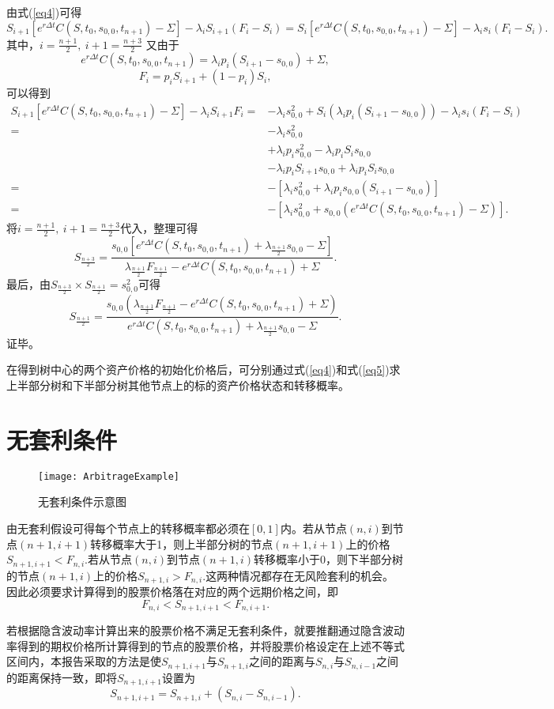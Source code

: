 \begin{Proof}
	由式(\ref{eq4})可得
	$$S_{i+1}\left[e^{r\Delta t}C(S,t_0,s_{0,0},t_{n+1}) -\Sigma \right]-\lambda_iS_{i+1}(F_i-S_i) = S_i\left[e^{r\Delta t}C(S,t_0,s_{0,0},t_{n+1}) -\Sigma \right]-\lambda_is_i(F_i-S_i).$$
	其中，$i = \frac{n+1}{2},\ i+1 = \frac{n+3}{2}$
	又由于
	$$e^{r\Delta t}C(S,t_0,s_{0,0},t_{n+1})  = \lambda_ip_i(S_{i+1}-s_{0,0})+\Sigma,$$
	$$F_i = p_iS_{i+1}+(1-p_i)S_i,$$
	可以得到
	\begin{align}
		S_{i+1}\left[e^{r\Delta t}C(S,t_0,s_{0,0},t_{n+1}) -\Sigma \right]-\lambda_iS_{i+1}F_i 
		=& -\lambda_is_{0,0}^2+S_i\left(\lambda_ip_i(S_{i+1}-s_{0,0})\right)-\lambda_is_i(F_i-S_i) \nonumber\\
		=&  -\lambda_is_{0,0}^2 \nonumber\\
		&+ \lambda_ip_is_{0,0}^2-\lambda_ip_iS_is_{0,0}\nonumber\\
		&-\lambda_ip_iS_{i+1}s_{0,0}+\lambda_ip_iS_is_{0,0}\nonumber\\
		= & -\left[\lambda_is_{0,0}^2+\lambda_ip_is_{0,0}(S_{i+1}-s_{0,0})\right] \nonumber\\
		= & -\left[\lambda_is_{0,0}^2+s_{0,0}\left(e^{r\Delta t}C(S,t_0,s_{0,0},t_{n+1})-\Sigma\right)\right] .\nonumber 
	\end{align}
	将$i = \frac{n+1}{2},\ i+1 = \frac{n+3}{2}$代入，整理可得
	$$S_{\frac{n+3}{2}} = \frac{s_{0,0}\left[e^{r\Delta t}C(S,t_0,s_{0,0},t_{n+1})+\lambda_{\frac{n+1}{2}} s_{0,0} - \Sigma\right]}{\lambda_{\frac{n+1}{2}} F_{\frac{n+1}{2}}-e^{r\Delta t}C(S,t_0,s_{0,0},t_{n+1})+\Sigma}.$$
	最后，由$S_{\frac{n+3}{2}}\times S_{\frac{n+1}{2}} = s_{0,0}^2$可得
	$$S_{\frac{n+1}{2}}  = \frac{s_{0,0}\left(\lambda_{\frac{n+1}{2}}  F_{\frac{n+1}{2}} - e^{r\Delta t}C(S,t_0,s_{0,0},t_{n+1}) + \Sigma \right)}{e^{r\Delta t}C(S,t_0,s_{0,0},t_{n+1})+\lambda_{\frac{n+1}{2}} s_{0,0}-\Sigma}.$$
	证毕。
\end{Proof}
在得到树中心的两个资产价格的初始化价格后，可分别通过式(\ref{eq4})和式(\ref{eq5})求上半部分树和下半部分树其他节点上的标的资产价格状态和转移概率。

\section{无套利条件}
\begin{figure}[H]
	\centering
	\texttt{[image: ArbitrageExample]}
	\caption{无套利条件示意图}
\end{figure}
由无套利假设可得每个节点上的转移概率都必须在$[0,1]$内。若从节点$(n,i)$到节点$(n+1,i+1)$转移概率大于1，则上半部分树的节点$(n+1,i+1)$上的价格$S_{n+1,i+1}<F_{n,i}.$若从节点$(n,i)$到节点$(n+1,i)$转移概率小于0，则下半部分树的节点$(n+1,i)$上的价格$S_{n+1,i}>F_{n,i}.$这两种情况都存在无风险套利的机会。因此必须要求计算得到的股票价格落在对应的两个远期价格之间，即
$$F_{n,i}<S_{n+1,i+1}<F_{n,i+1}.$$

若根据隐含波动率计算出来的股票价格不满足无套利条件，就要推翻通过隐含波动率得到的期权价格所计算得到的节点的股票价格，并将股票价格设定在上述不等式区间内，本报告采取的方法是使$S_{n+1,i+1}$与$S_{n+1,i}$之间的距离与$S_{n,i}$与$S_{n,i-1}$之间的距离保持一致，即将$S_{n+1,i+1}$设置为
$$S_{n+1,i+1} = S_{n+1,i}+\left(S_{n,i}-S_{n,i-1}\right).$$

